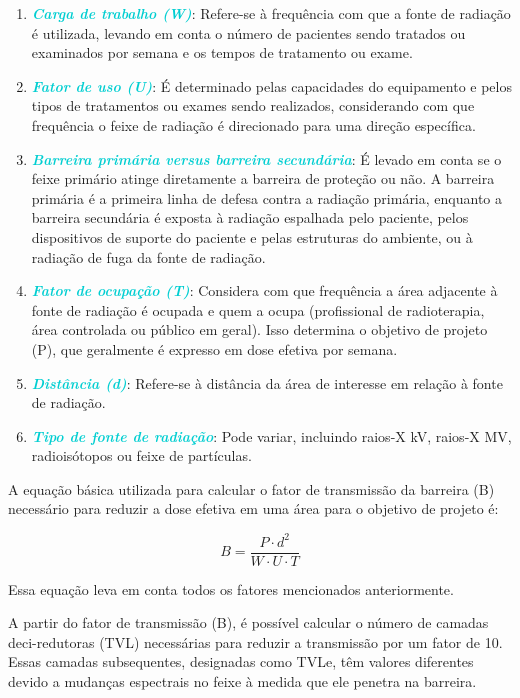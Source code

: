 \documentclass[11pt,a4paper]{article}
\begin{document}
	\begin{enumerate}
		\item \textcolor{DarkTurquoise}{\textbf{\textit{Carga de trabalho (W)}}}: Refere-se à frequência com que a fonte de radiação é utilizada, levando em conta o número de pacientes sendo tratados ou examinados por semana e os tempos de tratamento ou exame.
		\item \textcolor{DarkTurquoise}{\textbf{\textit{Fator de uso (U)}}}: É determinado pelas capacidades do equipamento e pelos tipos de tratamentos ou exames sendo realizados, considerando com que frequência o feixe de radiação é direcionado para uma direção específica.
		\item \textcolor{DarkTurquoise}{\textbf{\textit{Barreira primária versus barreira secundária}}}: É levado em conta se o feixe primário atinge diretamente a barreira de proteção ou não. A barreira primária é a primeira linha de defesa contra a radiação primária, enquanto a barreira secundária é exposta à radiação espalhada pelo paciente, pelos dispositivos de suporte do paciente e pelas estruturas do ambiente, ou à radiação de fuga da fonte de radiação.
		\item \textcolor{DarkTurquoise}{\textbf{\textit{Fator de ocupação (T)}}}: Considera com que frequência a área adjacente à fonte de radiação é ocupada e quem a ocupa (profissional de radioterapia, área controlada ou público em geral). Isso determina o objetivo de projeto (P), que geralmente é expresso em dose efetiva por semana.
		\item \textcolor{DarkTurquoise}{\textbf{\textit{Distância (d)}}}: Refere-se à distância da área de interesse em relação à fonte de radiação.
		\item \textcolor{DarkTurquoise}{\textbf{\textit{Tipo de fonte de radiação}}}: Pode variar, incluindo raios-X kV, raios-X MV, radioisótopos ou feixe de partículas.
	\end{enumerate}

	A equação básica utilizada para calcular o fator de transmissão da barreira (B) necessário para reduzir a dose efetiva em uma área para o objetivo de projeto é:
	
	\begin{equation}
		B = \frac{P \cdot d^2}{W \cdot U \cdot T}
	\end{equation}
	
	Essa equação leva em conta todos os fatores mencionados anteriormente.

	A partir do fator de transmissão (B), é possível calcular o número de camadas deci-redutoras (TVL) necessárias para reduzir a transmissão por um fator de 10. Essas camadas subsequentes, designadas como TVLe, têm valores diferentes devido a mudanças espectrais no feixe à medida que ele penetra na barreira.
\end{document}

